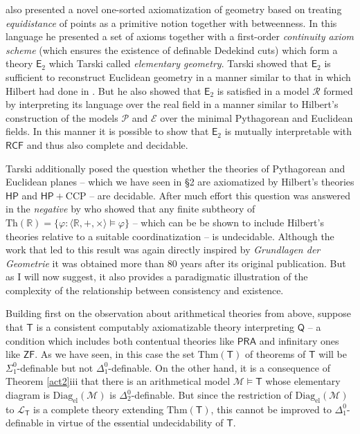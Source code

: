\documentclass[11pt,fleqn,leqno]{article}
\def\phi{\varphi}
\begin{document}
\citet{Tarski1959a} also presented a novel one-sorted axiomatization of geometry based on treating \textsl{equidistance} of points as a primitive notion together with betweenness.  In this language he presented a set of axioms together with a first-order \textsl{continuity axiom scheme} (which ensures the existence of definable Dedekind cuts) which form a theory $\mathsf{E}_2$ which Tarski called \textsl{elementary geometry}.  Tarski showed that $\mathsf{E}_2$ is sufficient to reconstruct Euclidean geometry in a manner similar to that in which Hilbert had done in \citeyearpar{Hilbert1899}.    But he also showed that $\mathsf{E}_2$ is satisfied in a model $\mathcal{R}$ formed by interpreting its language over the real field in a manner similar to Hilbert's construction of the models $\mathcal{P}$ and $\mathcal{E}$ over the minimal Pythagorean and Euclidean fields.  In this manner it is possible to show that $\mathsf{E}_2$  is mutually interpretable with $\mathsf{RCF}$ and thus also complete and decidable.   

Tarski additionally posed the question whether the theories of Pythagorean and Euclidean planes -- which we have seen in \S 2 are axiomatized by Hilbert's theories $\mathsf{HP}$ and $\mathsf{HP} + \mathrm{CCP}$ -- are decidable.   After much effort this question was answered in the \textsl{negative} by \citet{Ziegler1982} who showed that any finite subtheory of  $\mathrm{Th}(\mathbb{R}) =\{\phi : \langle \mathbb{R},+, \times\rangle \models \phi\}$  -- which can be be shown to include Hilbert's theories relative to a suitable coordinatization -- is undecidable.   Although the work that led to this result was again directly inspired by \textsl{Grundlagen der Geometrie} it was obtained more than 80 years after its original publication.   But as I will now suggest, it also provides a paradigmatic illustration of the complexity of the relationship between consistency and existence.   

Building first on the observation about arithmetical theories from above, suppose that $\mathsf{T}$ is a consistent computably axiomatizable theory interpreting $\mathsf{Q}$ -- a condition which includes both contentual theories like $\mathsf{PRA}$ and infinitary ones like $\mathsf{ZF}$.   As we have seen, in this case the set $\mathrm{Thm}(\mathsf{T})$ of theorems of $\mathsf{T}$ will be $\Sigma^0_1$-definable but not $\Delta^0_1$-definable.  On the other hand, it is a consequence of Theorem \ref{act2}iii that there is an arithmetical model $\mathcal{M} \models \mathsf{T}$ whose elementary diagram is $\mathrm{Diag}_{\mathrm{el}}(\mathcal{M})$ is $\Delta^0_2$-definable.   But since the restriction of $\mathrm{Diag}_{\mathrm{el}}(\mathcal{M})$ to $\mathcal{L}_{\mathsf{T}}$ is a complete theory extending $\mathrm{Thm}(\mathsf{T})$, this cannot be improved to $\Delta^0_1$-definable in virtue of the essential undecidability of $\mathsf{T}$.  
\end{document}
